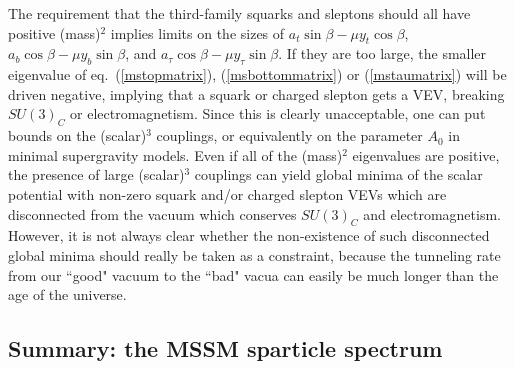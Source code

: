 The requirement that the third-family squarks and sleptons should all
have positive (mass)$^2$ implies limits on the sizes of $a_t\sin\beta
-\mu y_t \cos\beta$, $a_b\cos\beta - \mu y_b \sin\beta$,
and $a_\tau \cos\beta - \mu y_\tau \sin\beta$. If they are too large, the
smaller eigenvalue
of eq.~(\ref{mstopmatrix}), (\ref{msbottommatrix}) or (\ref{mstaumatrix})
will be driven
negative, implying that a squark or charged slepton gets a VEV, breaking
$SU(3)_C$ or electromagnetism. Since this is clearly unacceptable,
one can put bounds on the (scalar)$^3$ couplings, or equivalently
on the parameter $A_0$ in minimal supergravity models. Even
if all of
the (mass)$^2$ eigenvalues are positive, the presence of large
(scalar)$^3$ couplings can yield global minima of the scalar potential
with non-zero squark and/or charged slepton VEVs
which are disconnected from the vacuum which conserves $SU(3)_C$ and
electromagnetism.\cite{badvacua}
However, it is not always clear whether the non-existence of such
disconnected global
minima should really be taken as a constraint, 
because the tunneling rate from our ``good" vacuum to the
``bad"  vacua can easily be much longer than the age of the
universe.\cite{kusenko}

\subsection{Summary: the MSSM sparticle
spectrum}\label{subsec:MSSMspectrum.summary}

